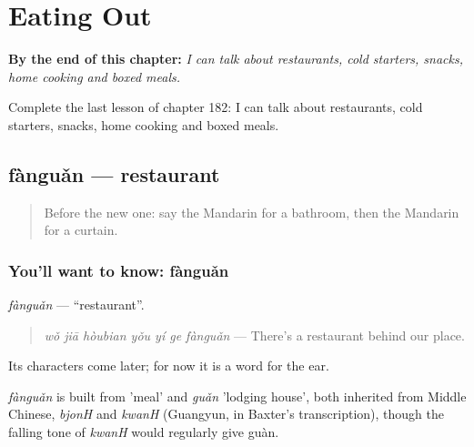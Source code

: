 
\chapter{Eating Out}
\label{ch:zh-eating-out}

\begin{chapteropening}
\textbf{By the end of this chapter:} \emph{I can talk about restaurants, cold starters, snacks, home cooking and boxed meals.}

Complete the last lesson of chapter 182: I can talk about restaurants, cold starters, snacks, home cooking and boxed meals.
\end{chapteropening}

\section[fànguǎn]{fànguǎn — restaurant}

\label{lesson:ZH-C182-fanguan}



\begin{quote}
Before the new one: say the Mandarin for a bathroom, then the Mandarin for a curtain.
\end{quote}

\subsection*{You'll want to know: fànguǎn}
\emph{fànguǎn} — \textquotedblleft{}restaurant\textquotedblright{}.

\begin{quote}
\emph{wǒ jiā hòubian yǒu yí ge fànguǎn} — There's a restaurant behind our place.
\end{quote}

Its characters come later; for now it is a word for the ear.

\begin{cousinweb}
\emph{fànguǎn} is built from  'meal' and \emph{guǎn} 'lodging house', both inherited from Middle Chinese, \emph{bjonH} and \emph{kwanH} (Guangyun, in Baxter's transcription), though the falling tone of \emph{kwanH} would regularly give guàn.
\end{cousinweb}


